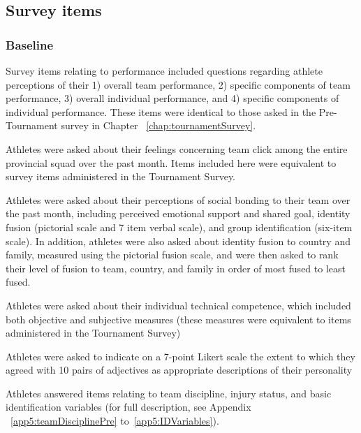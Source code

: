\begin{CJK}{UTF8}{gbsn}
\subsection{Survey items\label{app9:surveyItems}}

\subsubsection{Baseline\label{app9:surveyItemsBaseline}}

Survey items relating to performance included questions regarding athlete perceptions of their 1) overall team performance, 2) specific components of team performance, 3) overall individual performance, and 4) specific components of individual performance.  These items were identical to those asked in the Pre-Tournament survey in Chapter ~\ref{chap:tournamentSurvey}.

Athletes were asked about their feelings concerning team click among the entire provincial squad over the past month. Items included here were equivalent to survey items administered in the Tournament Survey.


Athletes were asked about their perceptions of social bonding to their team over the past month, including perceived emotional support and shared goal, identity fusion (pictorial scale and 7 item verbal scale), and group identification (six-item scale). In addition, athletes were also asked about identity fusion to country and family, measured using the pictorial fusion scale, and were then asked to rank their level of fusion to team, country, and family in order of most fused to least fused.

Athletes were asked about their individual technical competence, which included both objective and subjective measures (these measures were equivalent to items administered in the Tournament Survey)

Athletes were asked to indicate on a 7-point Likert scale the extent to which they agreed with 10 pairs of adjectives as appropriate descriptions of their personality

Athletes answered items relating to team discipline, injury status, and basic identification variables (for full description, see Appendix ~\ref{app5:teamDisciplinePre} to~\ref{app5:IDVariables}).



\end{CJK}
